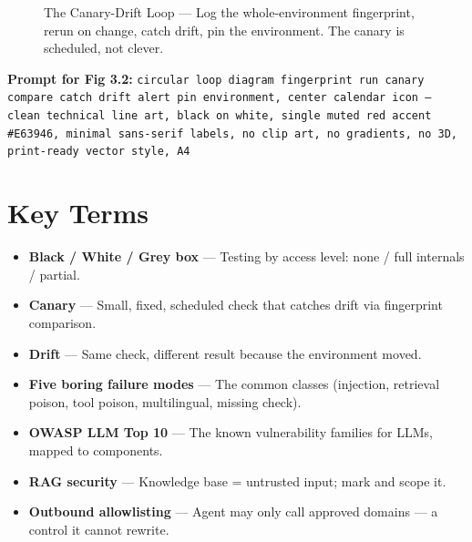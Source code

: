 \begin{figure}[htbp]
\centering
{}
\caption{The Canary-Drift Loop — Log the whole-environment fingerprint, rerun on change, catch drift, pin the environment. The canary is scheduled, not clever.}
\label{fig:3-2}
\end{figure}
\textbf{Prompt for Fig 3.2:} \texttt{circular loop diagram fingerprint run canary compare catch drift alert pin environment, center calendar icon — clean technical line art, black on white, single muted red accent \#E63946, minimal sans-serif labels, no clip art, no gradients, no 3D, print-ready vector style, A4}

\section{Key Terms}
\begin{itemize}
\item \textbf{Black / White / Grey box} — Testing by access level: none / full internals / partial.
\item \textbf{Canary} — Small, fixed, scheduled check that catches drift via fingerprint comparison.
\item \textbf{Drift} — Same check, different result because the environment moved.
\item \textbf{Five boring failure modes} — The common classes (injection, retrieval poison, tool poison, multilingual, missing check).
\item \textbf{OWASP LLM Top 10} — The known vulnerability families for LLMs, mapped to components.
\item \textbf{RAG security} — Knowledge base = untrusted input; mark and scope it.
\item \textbf{Outbound allowlisting} — Agent may only call approved domains — a control it cannot rewrite.
\end{itemize}

